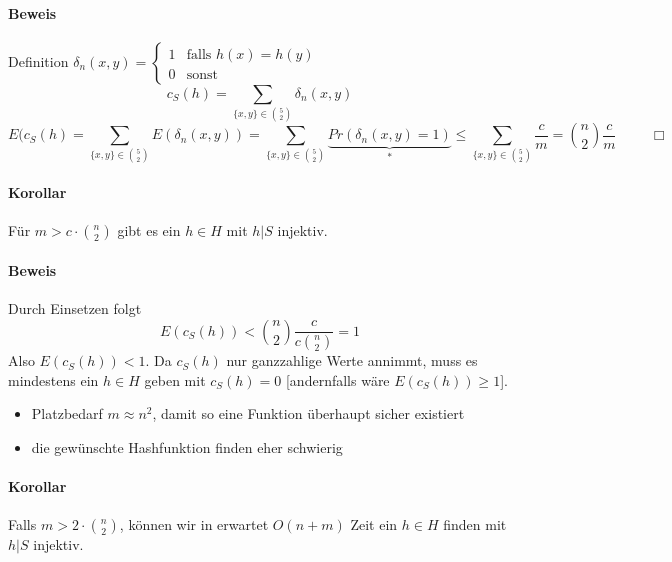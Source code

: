 \paragraph*{Beweis} Definition 
$\delta_n(x,y) = \begin{cases} 1 & \text{falls } h(x)=h(y) \\ 0 & \text{sonst} \end{cases}$
$$ c_S(h)=\sum\limits_{\{ x,y \} \in {5 \choose 2}} \delta_n(x,y) $$
$$ E(c_S(h) = \sum\limits_{\{x,y\} \in {5 \choose 2}} E(\delta_n(x,y)) = \sum\limits_{\{x,y\} \in {5 \choose 2}} \underbrace{Pr(\delta_n(x,y)=1)}_{*} \leq \sum\limits_{\{x,y\} \in {5 \choose 2}} \frac{c}{m} = {n \choose 2} \frac{c}{m} \hspace{1cm} \Box$$

\paragraph*{Korollar} Für $m>c \cdot {n \choose 2}$ gibt es ein $h \in H$ mit $h|S$ injektiv.

\paragraph*{Beweis} Durch Einsetzen folgt $$ E(c_S(h)) < {n \choose 2} \frac{c}{c {n \choose 2}} = 1 $$
Also $E(c_S(h)) < 1$. Da $c_S(h)$ nur ganzzahlige Werte annimmt, muss es mindestens ein $h \in H$ geben mit $c_S(h)=0$ [andernfalls wäre $E(c_S(h)) \geq 1$].


\begin{itemize}
	\item Platzbedarf $m \approx n^2$, damit so eine Funktion überhaupt sicher existiert
	\item die gewünschte Hashfunktion finden eher schwierig
\end{itemize}

\paragraph*{Korollar} Falls $m>2 \cdot {n \choose 2}$, können wir in erwartet $O(n+m)$ Zeit ein $h \in H$ finden mit $h|S$ injektiv.

